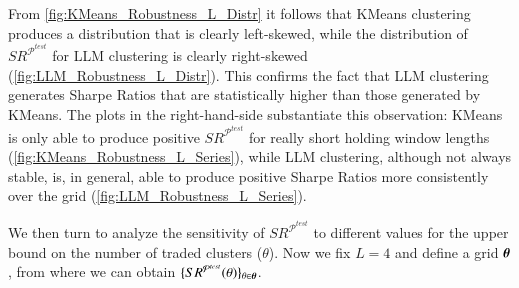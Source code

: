 \begin{figure}[H]
\end{figure}

From \cref{fig:KMeans_Robustness_L_Distr} it follows that KMeans clustering produces a distribution that is clearly left-skewed, while the distribution of $SR^{\mathcal P ^{test}}$ for LLM clustering is clearly right-skewed (\cref{fig:LLM_Robustness_L_Distr}). This confirms the fact that LLM clustering generates Sharpe Ratios that are statistically higher than those generated by KMeans. The plots in the right-hand-side substantiate this observation: KMeans is only able to produce positive $SR^{\mathcal P ^{test}}$ for really short holding window lengths (\cref{fig:KMeans_Robustness_L_Series}), while LLM clustering, although not always stable, is, in general, able to produce positive Sharpe Ratios more consistently over the grid (\cref{fig:LLM_Robustness_L_Series}).

\mx 
We then turn to analyze the sensitivity of $SR^{\mathcal P^{test}}$ to different values for the upper bound on the number of traded clusters ($\theta$). Now we fix $L=4$ and define a grid $\boldsymbol \theta$, from where we can obtain $\{SR^{\mathcal P^{test}}(\theta)\}_{\theta\in{\boldsymbol\theta}}$. 


